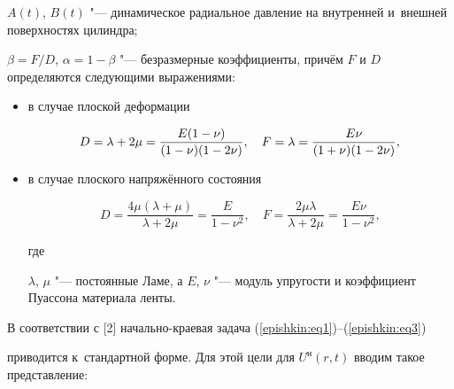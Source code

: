 $A(t)$, $B(t)$ "--- динамическое радиальное давление на внутренней и~внешней поверхностях  цилиндра;

$\beta ={F}/{D}$, $\alpha =1-\beta $ "--- безразмерные коэффициенты, причём $F$ и $D $ определяются следующими выражениями:



\begin{itemize}

\item в случае плоской деформации

\begin{equation*}



 D=\lambda +2\mu =\frac{E(1-\nu )}{(1-\nu )(1-2\nu )}, \quad

 F=\lambda =\frac{E\nu }{(1+\nu )(1-2\nu )}, \\ 


\end{equation*}



\item в случае плоского напряжённого состояния

\begin{equation*}



 D=\frac{4\mu (\lambda +\mu )}{\lambda +2\mu }=\frac{E}{1-\nu ^2}, \quad

 F=\frac{2\mu \lambda }{\lambda +2\mu }=\frac{E\nu }{1-\nu ^2}, 


\end{equation*}

где

$\lambda$, $\mu$ "--- постоянные Ламе, а $E$, $\nu$ "--- модуль упругости и коэффициент Пуассона материала ленты.

\end{itemize}



В соответствии с [2] начально-краевая задача (\ref{epishkin:eq1})--(\ref{epishkin:eq3}) %

приводится к~стандартной форме. Для этой цели для $U^{\text{н}}(r,t)$ вводим такое представление:

